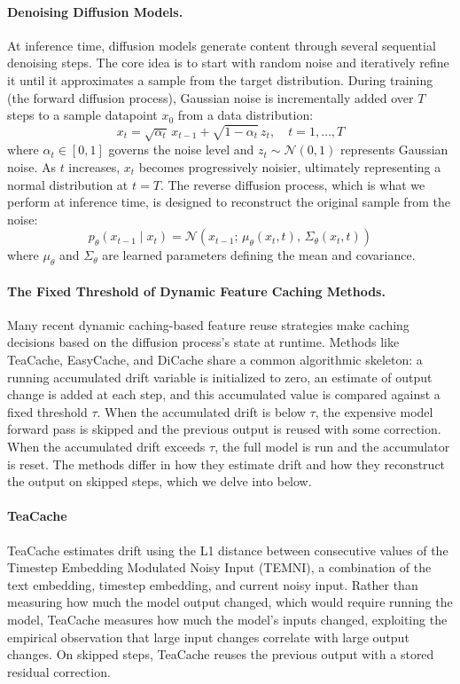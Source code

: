 \documentclass{article}
\begin{document}
\paragraph{Denoising Diffusion Models.}
At inference time, diffusion models generate content through several sequential denoising steps. The core idea is to start with random noise and iteratively refine it until it approximates a sample from the target distribution. During training (the forward diffusion process), Gaussian noise is incrementally added over $T$ steps to a sample datapoint $x_0$ from a data distribution:
\begin{equation}
    x_t = \sqrt{\alpha_t} \, x_{t-1} + \sqrt{1 - \alpha_t} \, z_t, \quad t = 1, \ldots, T
\end{equation}
where $\alpha_t \in [0, 1]$ governs the noise level and $z_t \sim \mathcal{N}(0, 1)$ represents Gaussian noise. As $t$ increases, $x_t$ becomes progressively noisier, ultimately representing a normal distribution at $t = T$. The reverse diffusion process, which is what we perform at inference time, is designed to reconstruct the original sample from the noise:
\begin{equation}
    p_\theta(x_{t-1} \mid x_t) = \mathcal{N}\!\left(x_{t-1};\, \mu_\theta(x_t, t),\, \Sigma_\theta(x_t, t)\right)
\end{equation}
where $\mu_\theta$ and $\Sigma_\theta$ are learned parameters defining the mean and covariance.

\paragraph{The Fixed Threshold of Dynamic Feature Caching Methods.}
Many recent dynamic caching-based feature reuse strategies make caching decisions based on the diffusion process's state at runtime. Methods like TeaCache, EasyCache, and DiCache share a common algorithmic skeleton: a running accumulated drift variable is initialized to zero, an estimate of output change is added at each step, and this accumulated value is compared against a fixed threshold $\tau$. When the accumulated drift is below $\tau$, the expensive model forward pass is skipped and the previous output is reused with some correction. When the accumulated drift exceeds $\tau$, the full model is run and the accumulator is reset. The methods differ in how they estimate drift and how they reconstruct the output on skipped steps, which we delve into below.

\paragraph{TeaCache}
TeaCache estimates drift using the L1 distance between consecutive values of the Timestep Embedding Modulated Noisy Input (TEMNI), a combination of the text embedding, timestep embedding, and current noisy input. Rather than measuring how much the model output changed, which would require running the model, TeaCache measures how much the model's inputs changed, exploiting the empirical observation that large input changes correlate with large output changes. On skipped steps, TeaCache reuses the previous output with a stored residual correction. 
\end{document}
